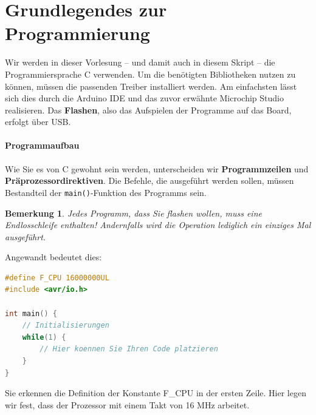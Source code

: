 \documentclass[11pt,a4paper]{scrartcl}
\newtheorem{note}{Bemerkung}
\begin{document}
\section{Grundlegendes zur Programmierung}
Wir werden in dieser Vorlesung -- und damit auch in diesem Skript -- die Programmiersprache C verwenden. Um die benötigten Bibliotheken nutzen zu können, müssen die passenden Treiber installiert werden. Am einfachsten lässt sich dies durch die Arduino IDE und das zuvor erwähnte Microchip Studio realisieren. Das \textbf{Flashen}, also das Aufspielen der Programme auf das Board, erfolgt über USB.
\paragraph{Programmaufbau}
Wie Sie es von C gewohnt sein werden, unterscheiden wir \textbf{Programmzeilen} und \textbf{Präprozessordirektiven}. Die Befehle, die ausgeführt werden sollen, müssen Bestandteil der \texttt{main()}-Funktion des Programms sein.
\begin{note}
Jedes Programm, dass Sie flashen wollen, muss eine Endlosschleife enthalten! Andernfalls wird die Operation lediglich ein einziges Mal ausgeführt.
\end{note} 
Angewandt bedeutet dies:
\begin{lstlisting}[language=C]
#define F_CPU 16000000UL
#include <avr/io.h>

int main() {
	// Initialisierungen
	while(1) {
		// Hier koennen Sie Ihren Code platzieren	
	}
}
\end{lstlisting}
Sie erkennen die Definition der Konstante F{\_}CPU in der ersten Zeile. Hier legen wir fest, dass der Prozessor mit einem Takt von 16 MHz arbeitet.
\end{document}
